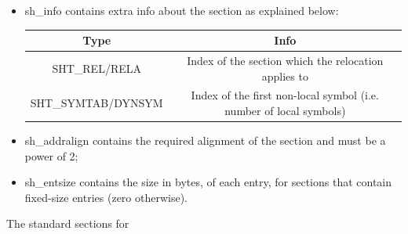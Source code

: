 \begin{itemize}
\begin{center}
    \end{center} \item {\ttfamily sh\_info} contains extra info about the section as explained below:
        \begin{center} \begin{tabular}{|c|c|} \hline \textbf{Type} & \textbf{Info} \\ \hline {\ttfamily
            SHT\_REL/RELA} & Index of the section which the relocation applies to\\ \hline {\ttfamily
        SHT\_SYMTAB/DYNSYM} & Index of the first non-local symbol (i.e. number of local symbols)\\ \hline
        \end{tabular} \end{center} \item {\ttfamily sh\_addralign} contains the required alignment of the
        section and must be a power of 2; \item {\ttfamily sh\_entsize} contains the size in bytes, of each
entry, for sections that contain fixed-size entries (zero otherwise).  \end{itemize} The standard sections for
